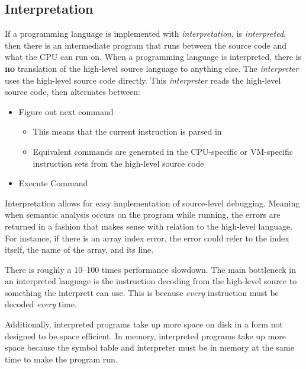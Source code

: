 \subsection{Interpretation}\label{subsec:Interpretation}
\begin{definition}[Interpretation]\label{def:Interpretation}
  If a programming language is implemented with \emph{interpretation}, is \emph{interpreted}, then there is an intermediate program that runs between the source code and what the CPU can run on.
  When a programming language is interpreted, there is \textbf{no} translation of the high-level source language to anything else.
  The \emph{interpreter} uses the high-level source code directly.
  This \emph{interpreter} reads the high-level source code, then alternates between:
  \begin{itemize}[noitemsep]
  \item Figure out next command
    \begin{itemize}[noitemsep]
    \item This means that the current instruction is parsed in
    \item Equivalent commands are generated in the CPU-specific or VM-specific instruction sets from the high-level source code
    \end{itemize}
  \item Execute Command
  \end{itemize}

  Interpretation allows for easy implementation of source-level debugging.
  Meaning when semantic analysis occurs on the program while running, the errors are returned in a fashion that makes sense with relation to the high-level language.
  For instance, if there is an array index error, the error could refer to the index itself, the name of the array, and its line.

  \begin{remark}\label{rmk:Interpretation_Drawbacks}
    There is roughly a 10--100 times performance slowdown.
    The main bottleneck in an interpreted language is the instruction decoding from the high-level source to something the interprett can use.
    This is because \textit{every} instruction must be decoded \textit{every} time.

    Additionally, interpreted programs take up more space on disk in a form not designed to be space efficient.
    In memory, interpreted programs take up more space because the symbol table and interpreter must be in memory at the same time to make the program run.
  \end{remark}
\end{definition}

